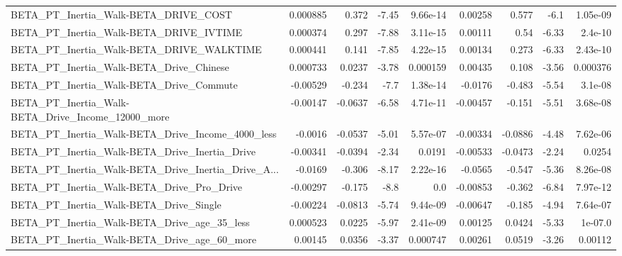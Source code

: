 \begin{tabular}{lrrrrrrrr}
BETA\_PT\_Inertia\_Walk-BETA\_DRIVE\_COST               &    0.000885 &        0.372 &    -7.45 & 9.66e-14 &    0.00258 &       0.577 &         -6.1 &      1.05e-09 \\
BETA\_PT\_Inertia\_Walk-BETA\_DRIVE\_IVTIME             &    0.000374 &        0.297 &    -7.88 & 3.11e-15 &    0.00111 &        0.54 &        -6.33 &       2.4e-10 \\
BETA\_PT\_Inertia\_Walk-BETA\_DRIVE\_WALKTIME           &    0.000441 &        0.141 &    -7.85 & 4.22e-15 &    0.00134 &       0.273 &        -6.33 &      2.43e-10 \\
BETA\_PT\_Inertia\_Walk-BETA\_Drive\_Chinese            &    0.000733 &       0.0237 &    -3.78 & 0.000159 &    0.00435 &       0.108 &        -3.56 &      0.000376 \\
BETA\_PT\_Inertia\_Walk-BETA\_Drive\_Commute            &    -0.00529 &       -0.234 &     -7.7 & 1.38e-14 &    -0.0176 &      -0.483 &        -5.54 &       3.1e-08 \\
BETA\_PT\_Inertia\_Walk-BETA\_Drive\_Income\_12000\_more  &    -0.00147 &      -0.0637 &    -6.58 & 4.71e-11 &   -0.00457 &      -0.151 &        -5.51 &      3.68e-08 \\
BETA\_PT\_Inertia\_Walk-BETA\_Drive\_Income\_4000\_less   &     -0.0016 &      -0.0537 &    -5.01 & 5.57e-07 &   -0.00334 &     -0.0886 &        -4.48 &      7.62e-06 \\
BETA\_PT\_Inertia\_Walk-BETA\_Drive\_Inertia\_Drive      &    -0.00341 &      -0.0394 &    -2.34 &   0.0191 &   -0.00533 &     -0.0473 &        -2.24 &        0.0254 \\
BETA\_PT\_Inertia\_Walk-BETA\_Drive\_Inertia\_Drive\_A... &     -0.0169 &       -0.306 &    -8.17 & 2.22e-16 &    -0.0565 &      -0.547 &        -5.36 &      8.26e-08 \\
BETA\_PT\_Inertia\_Walk-BETA\_Drive\_Pro\_Drive          &    -0.00297 &       -0.175 &     -8.8 &      0.0 &   -0.00853 &      -0.362 &        -6.84 &      7.97e-12 \\
BETA\_PT\_Inertia\_Walk-BETA\_Drive\_Single             &    -0.00224 &      -0.0813 &    -5.74 & 9.44e-09 &   -0.00647 &      -0.185 &        -4.94 &      7.64e-07 \\
BETA\_PT\_Inertia\_Walk-BETA\_Drive\_age\_35\_less        &    0.000523 &       0.0225 &    -5.97 & 2.41e-09 &    0.00125 &      0.0424 &        -5.33 &       1e-07.0 \\
BETA\_PT\_Inertia\_Walk-BETA\_Drive\_age\_60\_more        &     0.00145 &       0.0356 &    -3.37 & 0.000747 &    0.00261 &      0.0519 &        -3.26 &       0.00112 \\

\end{tabular}
